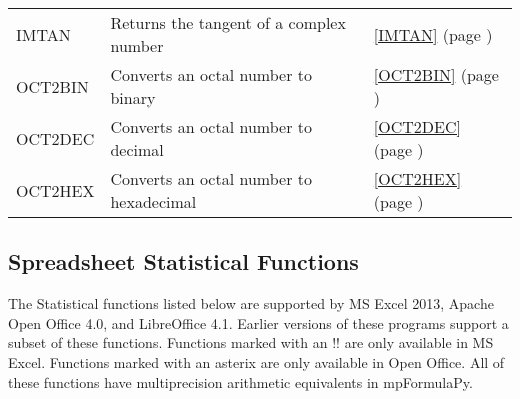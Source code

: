 \begin{center}
\begin{longtable}{l l l }
		IMTAN & Returns the tangent of a complex number &  \ref{IMTAN} (page \pageref{IMTAN}) \index{Spreadsheet Functions!IMTAN} \\
		
		OCT2BIN & Converts an octal number to binary &  \ref{OCT2BIN} (page \pageref{OCT2BIN}) \index{Spreadsheet Functions!OCT2BIN} \\
		OCT2DEC & Converts an octal number to decimal &  \ref{OCT2DEC} (page \pageref{OCT2DEC}) \index{Spreadsheet Functions!OCT2DEC} \\
		OCT2HEX & Converts an octal number to hexadecimal &  \ref{OCT2HEX} (page \pageref{OCT2HEX}) \index{Spreadsheet Functions!OCT2HEX} \\				
	\end{longtable}
\end{center}





\newpage 
\subsection{Spreadsheet Statistical Functions}
The Statistical functions listed below are supported by MS Excel 2013, Apache Open Office 4.0, and LibreOffice 4.1. Earlier versions of these programs support a subset of these functions.  
Functions marked with an !! are only available in MS Excel. Functions marked with an asterix are only available in Open Office.
All of these functions have multiprecision arithmetic equivalents in mpFormulaPy.




